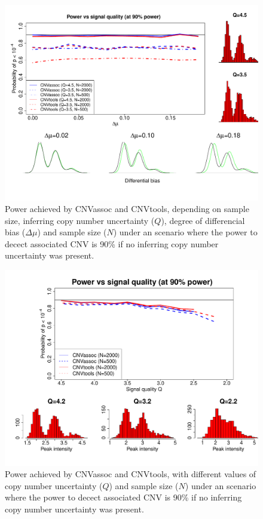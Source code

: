 \documentclass[11pt]{article}
\begin{document}
\begin{figure}[ht] 
\begin{center}
\includegraphics{./figures/main_figure_new.pdf}
\caption{\small Power achieved by CNVassoc and CNVtools, depending on sample size, inferring copy number uncertainty ($Q$), 
degree of differencial bias ($\Delta \mu$) and sample size ($N$) under an scenario where the power to decect 
associated CNV is 90\% if no inferring copy number uncertainty was present.}
\label{fig-Qnew}
\end{center}
\end{figure}

\begin{figure}[ht] 
\begin{center}
\includegraphics{./figures/main_fugure_Q.pdf}
\caption{\small Power achieved by CNVassoc and CNVtools, with different values of copy number uncertainty ($Q$) and sample size ($N$) 
under an scenario where the power to decect associated CNV is 90\% if no inferring copy number uncertainty was present.}
\label{fig-Q}
\end{center}
\end{figure}
\end{document}
